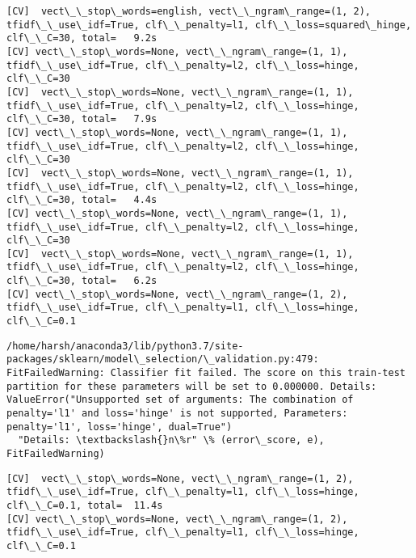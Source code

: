 \documentclass[11pt]{article}
\begin{document}
    \begin{Verbatim}[commandchars=\\\{\}]
[CV]  vect\_\_stop\_words=english, vect\_\_ngram\_range=(1, 2), tfidf\_\_use\_idf=True, clf\_\_penalty=l1, clf\_\_loss=squared\_hinge, clf\_\_C=30, total=   9.2s
[CV] vect\_\_stop\_words=None, vect\_\_ngram\_range=(1, 1), tfidf\_\_use\_idf=True, clf\_\_penalty=l2, clf\_\_loss=hinge, clf\_\_C=30 
[CV]  vect\_\_stop\_words=None, vect\_\_ngram\_range=(1, 1), tfidf\_\_use\_idf=True, clf\_\_penalty=l2, clf\_\_loss=hinge, clf\_\_C=30, total=   7.9s
[CV] vect\_\_stop\_words=None, vect\_\_ngram\_range=(1, 1), tfidf\_\_use\_idf=True, clf\_\_penalty=l2, clf\_\_loss=hinge, clf\_\_C=30 
[CV]  vect\_\_stop\_words=None, vect\_\_ngram\_range=(1, 1), tfidf\_\_use\_idf=True, clf\_\_penalty=l2, clf\_\_loss=hinge, clf\_\_C=30, total=   4.4s
[CV] vect\_\_stop\_words=None, vect\_\_ngram\_range=(1, 1), tfidf\_\_use\_idf=True, clf\_\_penalty=l2, clf\_\_loss=hinge, clf\_\_C=30 
[CV]  vect\_\_stop\_words=None, vect\_\_ngram\_range=(1, 1), tfidf\_\_use\_idf=True, clf\_\_penalty=l2, clf\_\_loss=hinge, clf\_\_C=30, total=   6.2s
[CV] vect\_\_stop\_words=None, vect\_\_ngram\_range=(1, 2), tfidf\_\_use\_idf=True, clf\_\_penalty=l1, clf\_\_loss=hinge, clf\_\_C=0.1 

    \end{Verbatim}

    \begin{Verbatim}[commandchars=\\\{\}]
/home/harsh/anaconda3/lib/python3.7/site-packages/sklearn/model\_selection/\_validation.py:479: FitFailedWarning: Classifier fit failed. The score on this train-test partition for these parameters will be set to 0.000000. Details: 
ValueError("Unsupported set of arguments: The combination of penalty='l1' and loss='hinge' is not supported, Parameters: penalty='l1', loss='hinge', dual=True")
  "Details: \textbackslash{}n\%r" \% (error\_score, e), FitFailedWarning)

    \end{Verbatim}

    \begin{Verbatim}[commandchars=\\\{\}]
[CV]  vect\_\_stop\_words=None, vect\_\_ngram\_range=(1, 2), tfidf\_\_use\_idf=True, clf\_\_penalty=l1, clf\_\_loss=hinge, clf\_\_C=0.1, total=  11.4s
[CV] vect\_\_stop\_words=None, vect\_\_ngram\_range=(1, 2), tfidf\_\_use\_idf=True, clf\_\_penalty=l1, clf\_\_loss=hinge, clf\_\_C=0.1 

    \end{Verbatim}
\end{document}
